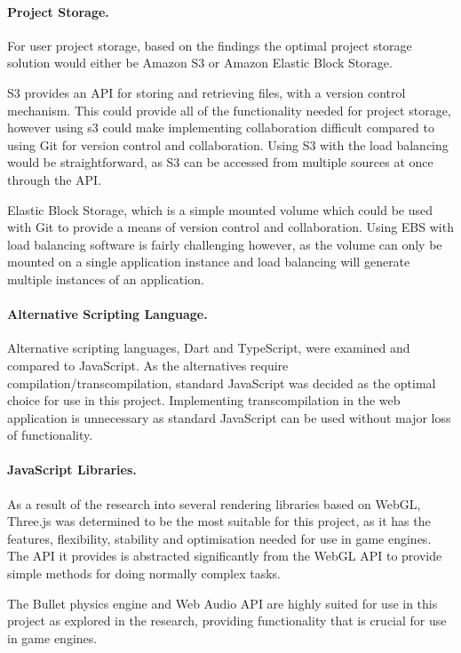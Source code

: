 \documentclass[a4paper, 12pt]{article}
\begin{document}
\paragraph{Project Storage.}
For user project storage, based on the findings the optimal project storage solution would either be Amazon S3 or Amazon Elastic Block Storage.

S3 provides an API for storing and retrieving files, with a version control mechanism. This could provide all of the functionality needed for project storage, however using s3 could make implementing collaboration difficult compared to using Git for version control and collaboration. Using S3 with the load balancing would be straightforward, as S3 can be accessed from multiple sources at once through the API.

Elastic Block Storage, which is a simple mounted volume which could be used with Git to provide a means of version control and collaboration. Using EBS with load balancing software is fairly challenging however, as the volume can only be mounted on a single application instance and load balancing will generate multiple instances of an application.

\paragraph{Alternative Scripting Language.}
Alternative scripting languages, Dart and TypeScript, were examined and compared to JavaScript. As the alternatives require compilation/transcompilation, standard JavaScript was decided as the optimal choice for use in this project. Implementing transcompilation in the web application is unnecessary as standard JavaScript can be used without major loss of functionality.

\paragraph{JavaScript Libraries.}
As a result of the research into several rendering libraries based on WebGL, Three.js was determined to be the most suitable for this project, as it has the features, flexibility, stability and optimisation needed for use in game engines. The API it provides is abstracted significantly from the WebGL API to provide simple methods for doing normally complex tasks.

The Bullet physics engine and Web Audio API are highly suited for use in this project as explored in the research, providing functionality that is crucial for use in game engines.
\end{document}
